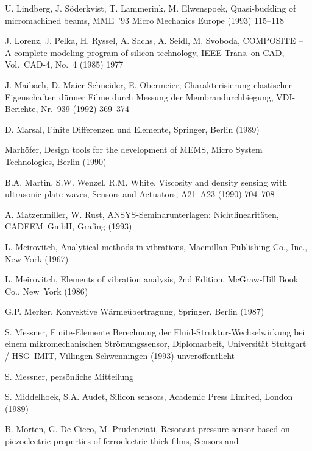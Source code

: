\begin{thebibliography}{xxx}
 U. Lindberg, J. Söderkvist, T. Lammerink, M. Elwenspoek, Quasi-buckling of
 micromachined beams, MME~'93 Micro Mechanics Europe (1993) 115--118

 J. Lorenz, J. Pelka, H. Ryssel, A. Sachs, A. Seidl, M. Svoboda,
 {\sf COMPOSITE} -- A complete modeling program of silicon technology,
 IEEE Trans. on CAD, Vol.~CAD-4, No.~4 (1985) 1977

 J. Maibach, D. Maier-Schneider, E. Obermeier, Charakterisierung elastischer
 Eigenschaften dünner Filme durch Messung der Membrandurchbiegung,
 VDI-Berichte, Nr.~939 (1992) 369--374

 D. Marsal, Finite Differenzen und Elemente, Springer, Berlin (1989)

 Marhöfer, Design tools for the development of MEMS, Micro System
 Technologies, Berlin (1990)

 B.A. Martin, S.W. Wenzel, R.M. White, Viscosity and density sensing with
 ultrasonic plate waves, Sensors and Actuators, A21--A23 (1990) 704--708

 A. Matzenmiller, W. Rust, {\sf ANSYS}-Seminarunterlagen: Nichtlinearitäten,
 CADFEM~GmbH, Grafing (1993)

 L. Meirovitch, Analytical methods in vibrations, Macmillan Publishing Co.,
 Inc., New York (1967)

 L. Meirovitch, Elements of vibration analysis, 2nd Edition, McGraw-Hill
 Book Co., New~York (1986)

 G.P. Merker, Konvektive Wärmeübertragung, Springer, Berlin (1987)

 S. Messner, Finite-Elemente Berechnung der Fluid-\-Struktur-\-Wechselwirkung
 bei einem mikromechanischen Strömungssensor, Diplomarbeit,
 Universität Stuttgart / HSG--IMIT, Villingen-Schwenningen (1993)
 unveröffentlicht

 S. Messner, persönliche Mitteilung

 S. Middelhoek, S.A. Audet, Silicon sensors, Academic Press Limited,
 London (1989)

 B. Morten, G. De Cicco, M. Prudenziati, Resonant pressure sensor based on
 piezoelectric properties of ferroelectric thick films, Sensors and


\end{thebibliography}
